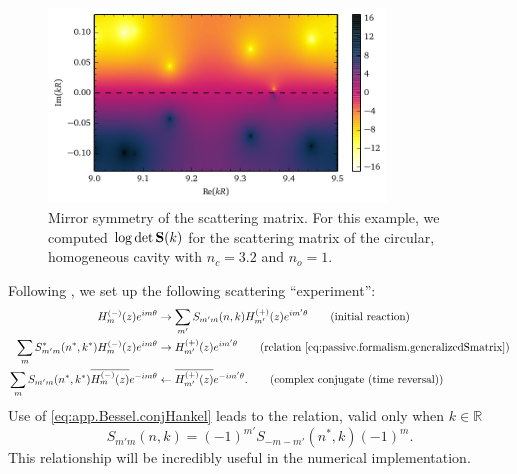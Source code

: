 \begin{figure}
 \centering
 \includegraphics[width=0.8\textwidth]{figs/passive/determinantSmatrix.pdf}
 \caption[Mirror symmetry of the scattering matrix]
	 {Mirror symmetry of the scattering matrix. For this example, 
	 we computed $\log\det\mathbf{S}(k)$ for the scattering matrix of the
	 circular, homogeneous cavity with $n_c=3.2$ and $n_o=1$.}
  \label{fig:passive.formalism.symmetrySmatrix}
\end{figure}

Following \cite{GAP2013a}, we set up the following scattering
``experiment'':
  \begin{align*}
    H_m^{(-)}(z)e^{im\theta}					&\rightarrow \sum_{m'} S_{m'm}(n,k)H_{m'}^{(+)}(z)e^{im'\theta}	\tag{initial reaction}\\
    \sum_{m}S_{m'm}^*(n^*,k^*)H_m^{(-)}(z)e^{im\theta}		&\rightarrow H_{m'}^{(+)}(z)e^{im'\theta}			\tag{relation \eqref{eq:passive.formalism.generalizedSmatrix}}\\
    \sum_{m}S_{m'm}(n^*,k^*)\overline{H_m^{(-)}(z)}e^{-im\theta}&\leftarrow \overline{H_{m'}^{(+)}(z)}e^{-im'\theta}.		\tag{complex conjugate (time reversal)}
  \end{align*}
Use of \eqref{eq:app.Bessel.conjHankel}
leads to the relation, valid only when $k\in\mathbb{R}$
  \begin{equation}
    \label{eq:passive.formalism.timeReversalSymmetryReal}
    S_{m'm}(n,k) = (-1)^{m'}S_{-m-m'}(n^*,k)(-1)^m.
  \end{equation}
This relationship will be incredibly useful in the numerical implementation.

